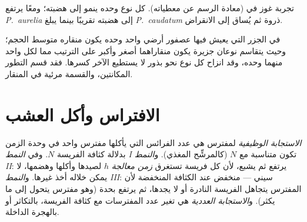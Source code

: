 \begin{omfigure}

{\small تجربة غوز في  (معادة الرسم عن معطياته).
كل نوع وحده ينمو إلى هضبته؛ ومعًا يرتفع \emph{P.~aurelia}
إلى هضبته تقريبًا بينما يبلغ \emph{P.~caudatum} ذروة ثم يُساق
إلى الانقراض.}
\end{omfigure}

\begin{example}\label{ex:b1:species-interactions:finches}
في الجزر التي يعيش فيها عصفور أرضي واحد وحده يكون منقاره متوسط
الحجم؛ وحيث يتقاسم نوعان جزيرة يكون منقاراهما
أصغر وأكبر على الترتيب مما لكل واحد منهما وحده، وقد انزاح كل نوع
نحو بذور لا يستطيع الآخر كسرها. فقد قسم التطور المكانتين،
والقسمة مرئية في المنقار.
\end{example}

\section{الافتراس وأكل العشب}

\begin{definition}\label{def:b1:species-interactions:functional}
\emph{الاستجابة الوظيفية} لمفترس هي عدد الفرائس التي يأكلها
مفترس واحد في وحدة الزمن بدلالة كثافة الفريسة $N$.
وفي \emph{النمط I} تكون متناسبة مع $N$ (كالمرشِّح المغذي). و\emph{النمط II}:
يرتفع ثم يشبع، لأن كل فريسة تستغرق \emph{زمن معالجة}
$h$ لصيدها وأكلها وهضمها، لا يمكن خلاله أخذ غيرها.
و\emph{النمط III}: سيني --- منخفض عند الكثافة المنخفضة لأن المفترس
يتجاهل الفريسة النادرة أو لا يجدها، ثم يرتفع بحدة (وهو مفترس
يتحول إلى ما يكثر). و\emph{الاستجابة العددية} هي
تغير عدد المفترسات مع كثافة الفريسة، بالتكاثر
أو بالهجرة الداخلة.
\end{definition}

